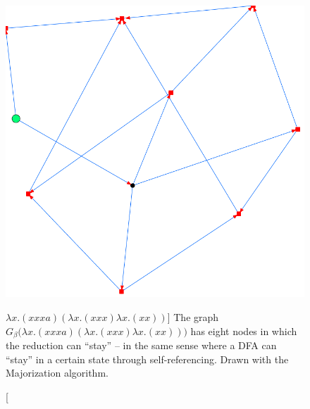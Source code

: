 \begin{figure}[htbp]
	\centering
		\includegraphics[height=\exampleheight]{../images/SelfRef_2_MAJOR.png}
	\caption
	[$\lambda x.(x x x a) (\lambda x.(x x x) \lambda x.(x x))$]
	{The graph $G_\beta\big(\lambda x.(x x x a) (\lambda x.(x x x) \lambda x.(x x))\big)$
	has eight nodes in which the reduction can ``stay'' -- in the same sense where a 
	DFA can ``stay'' in a certain state through self-referencing. 
	Drawn with the Majorization algorithm.}
	\label{fig:images_SelfRef_1_MAJOR}
\end{figure}

